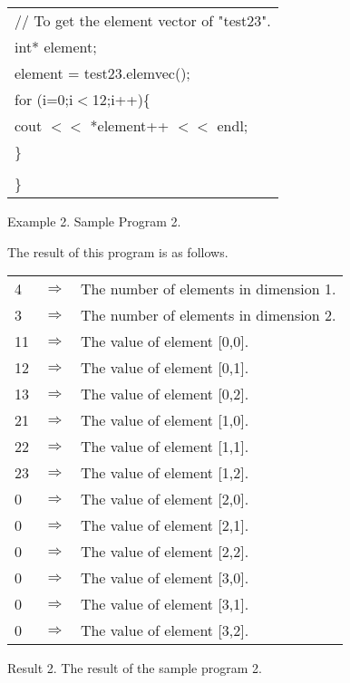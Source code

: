 {\begin{center}
\begin{tabular}{|l|}
\hspace*{10mm}// To get the element vector of "test23".\\
\hspace*{10mm}int* element;\\
\hspace*{10mm}element = test23.elemvec();\\
\hspace*{10mm}for (i=0;i$<$12;i++)\{\\
\hspace*{20mm}cout $<<$ *element++ $<<$ endl;\\
\hspace*{10mm}\}\\
\\
\}\\\hline
\end{tabular}
\vspace*{5mm}

Example 2. Sample Program 2.
\end{center}
}

\clearpage

\noindent
The result of this program is as follows.

\begin{center}
\begin{tabular}{|lll|}\hline
4  & $\Longrightarrow$  & The number of elements in dimension 1.\\
3  & $\Longrightarrow$  & The number of elements in dimension 2.\\
11 & $\Longrightarrow$  & The value of element [0,0].\\
12 & $\Longrightarrow$  & The value of element [0,1].\\
13 & $\Longrightarrow$  & The value of element [0,2].\\
21 & $\Longrightarrow$  & The value of element [1,0].\\
22 & $\Longrightarrow$  & The value of element [1,1].\\
23 & $\Longrightarrow$  & The value of element [1,2].\\
0  & $\Longrightarrow$  & The value of element [2,0].\\
0  & $\Longrightarrow$  & The value of element [2,1].\\
0  & $\Longrightarrow$  & The value of element [2,2].\\
0  & $\Longrightarrow$  & The value of element [3,0].\\
0  & $\Longrightarrow$  & The value of element [3,1].\\
0  & $\Longrightarrow$  & The value of element [3,2].\\\hline
\end{tabular}
\vspace*{5mm}

Result 2. The result of the sample program 2.
\end{center}

